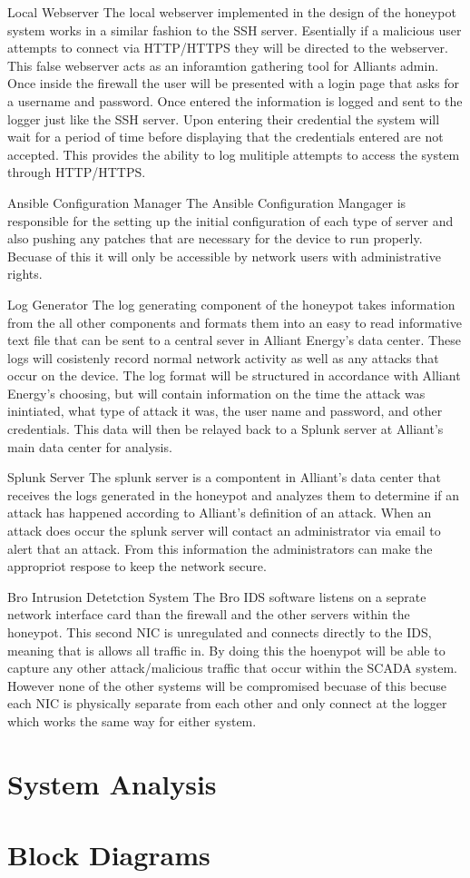 Local Webserver
The local webserver implemented in the design of the honeypot system works in a similar fashion to the SSH server. Esentially if a malicious user attempts to connect via HTTP/HTTPS they will be directed to the webserver.  This false webserver acts as an inforamtion gathering tool for Alliants admin.  Once inside the firewall the user will be presented with a login page that asks for a username and password.  Once entered the information is logged and sent to the logger just like the SSH server.  Upon entering their credential the system will wait for a period of time before displaying that the credentials entered are not accepted.  This provides the ability to log mulitiple attempts to access the system through HTTP/HTTPS.

Ansible Configuration Manager
The Ansible Configuration Mangager is responsible for the setting up the initial configuration of each type of server and also pushing any patches that are necessary for the device to run properly.  Becuase of this it will only be accessible by network users with administrative rights.

Log Generator
The log generating component of the honeypot takes information from the all other components and formats them into an easy to read informative text file that can be sent to a central sever in Alliant Energy's data center.  These logs will cosistenly record normal network activity as well as any attacks that occur on the device.  The log format will be structured in accordance with Alliant Energy's choosing, but will contain information on the time the attack was inintiated, what type of attack it was, the user name and password, and other credentials.  This data will then be relayed back to a Splunk server at Alliant's main data center for analysis.

Splunk Server
The splunk server is a compontent in Alliant's data center that receives the logs generated in the honeypot and analyzes them to determine if an attack has happened according to Alliant's definition of an attack.  When an attack does occur the splunk server will contact an administrator via email to alert that an attack.  From this information the administrators can make  the appropriot respose to keep the network secure.

Bro Intrusion Detetction System
The Bro IDS software listens on a seprate network interface card than the firewall and the other servers within the honeypot.  This second NIC is unregulated and connects directly to the IDS, meaning that is allows all traffic in.  By doing this the hoenypot will be able to capture any other attack/malicious traffic that occur within the SCADA system.  However none of the other systems will be compromised becuase of this becuse each NIC is physically separate from each other and only connect at the logger which works the same way for either system.  

\section{System Analysis}

\Blindtext

\section{Block Diagrams}

\Blindtext
